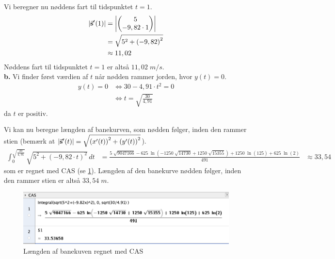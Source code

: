 \documentclass{article}
\begin{document}
Vi beregner nu nøddens fart til tidspunktet $t=1$.
\begin{equation*}
\begin{split}
  \abs{\va{s}'(1)} &=\abs{\mqty(5\\ -9,82 \cdot 1) } \\
  &=\sqrt{5^2+\left(-9,82\right)^2} \\
  &\approx 11,02
\end{split}
\end{equation*}
Nøddens fart til tidspunktet $t=1$ er altså $11,02 \;\unit{m/s} $.\\[1ex]
\textbf{b.}
Vi finder først værdien af $t$ når nødden rammer jorden, hvor $y(t)=0$. 
\begin{equation*}
\begin{split}
  y(t)=0 &\iff 30-4,91 \cdot t^2=0 \\
  &\iff t=\sqrt{\frac{30}{4,91}} 
\end{split}
\end{equation*}
da $t$ er positiv. 

\noindent Vi kan nu beregne længden af banekurven, som nødden følger, inden den rammer stien (bemærk at $\abs{\va{s}'(t)} =\sqrt{\left(x'(t)\right)^2 + \left(y'(t)\right)^2} $).
\begin{equation*}
\begin{split}
  \int_{0}^{\sqrt{\frac{30}{4,91}} } \sqrt{5^2 + \left(-9,82 \cdot t\right)^2}  \,dt &=\frac{5 \; \sqrt{9047166} - 625 \; \ln\left(-1250 \; \sqrt{14730} + 1250 \; \sqrt{15355} \right) + 1250 \; \ln\left(125 \right) + 625 \; \ln\left(2 \right)}{491}
  &\approx 33,54
\end{split}
\end{equation*}
som er regnet med CAS (se \cref{fig:CAS}).
Længden af den banekurve nødden følger, inden den rammer stien er altså $33,54 \;\unit{m} $.

\begin{figure}[H]
\begin{center}
  \includegraphics[scale=0.5]{CAS.png}
\end{center}
\caption{Længden af banekuven regnet med CAS}
\label{fig:CAS}
\end{figure}
\end{document}
